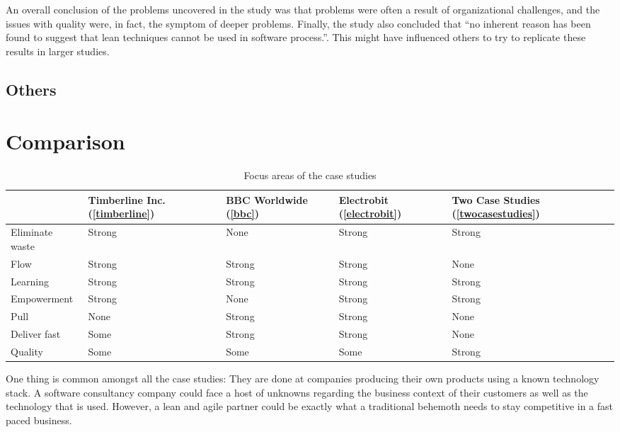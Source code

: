 An overall conclusion of the problems uncovered in the study was that problems were often a result of organizational challenges, and the issues with quality were, in fact, the symptom of deeper problems. Finally, the study also concluded that ``no inherent reason has been found to suggest that lean techniques cannot be used in software process.''\cite{Middleton2001Lean}. This might have influenced others to try to replicate these results in larger studies.



\subsection{Others}
\label{othercases}


\section{Comparison}
\label{section:comparison}

\begin{table}
  \begin{tabular}{ | l | p{65pt} | p{65pt} | p{65pt} | p{65pt} |}
    \hline
      & Timberline Inc. (\ref{timberline}) & BBC Worldwide (\ref{bbc}) & Electrobit (\ref{electrobit}) & Two Case Studies (\ref{twocasestudies}) \\
    \hline
    Eliminate waste & Strong & None   & Strong & Strong \\
    \hline
    Flow            & Strong & Strong & Strong & None \\
    \hline
    Learning        & Strong & Strong & Strong & Strong \\
    \hline
    Empowerment     & Strong & None   & Strong & Strong \\
    \hline
    Pull            & None   & Strong & Strong & None \\
    \hline
    Deliver fast    & Some   & Strong & Strong & None \\
    \hline
    Quality         & Some   & Some   & Some   & Strong \\
    \hline
  \end{tabular}
  \caption{Focus areas of the case studies}
  \label{tbl:practices}
\end{table}

One thing is common amongst all the case studies: They are done at companies producing their own products using a known technology stack. A software consultancy company could face a host of unknowns regarding the business context of their customers as well as the technology that is used. However, a lean and agile partner could be exactly what a traditional behemoth needs to stay competitive in a fast paced business.

